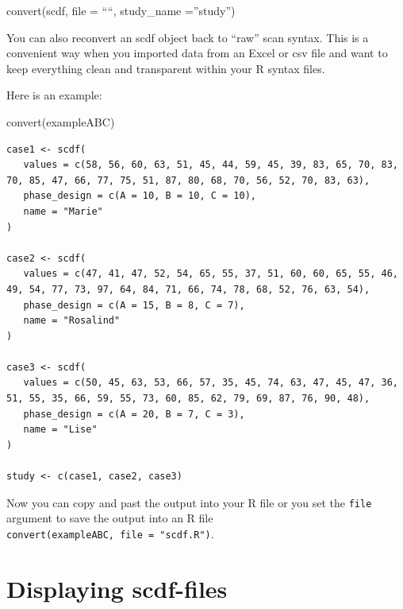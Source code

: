 \documentclass[
  letterpaper,
  DIV=11,
  numbers=noendperiod]{scrreprt}
\newenvironment{Shaded}{\begin{snugshade}}{\end{snugshade}}
\newcommand{\FunctionTok}[1]{\textcolor[rgb]{0.28,0.35,0.67}{#1}}
\newcommand{\NormalTok}[1]{\textcolor[rgb]{0.00,0.23,0.31}{#1}}
\begin{document}
\begin{tcolorbox}[enhanced jigsaw, toprule=.15mm, colframe=quarto-callout-tip-color-frame, left=2mm, colback=white, breakable, bottomrule=.15mm, arc=.35mm, rightrule=.15mm, leftrule=.75mm, opacityback=0]
\begin{minipage}[t]{5.5mm}
\textcolor{quarto-callout-tip-color}{\faLightbulb}
\end{minipage}%
\begin{minipage}[t]{\textwidth - 5.5mm}
convert(scdf, file = ````, study\_name =''study'')\end{minipage}%
\end{tcolorbox}

You can also reconvert an scdf object back to ``raw'' scan syntax. This
is a convenient way when you imported data from an Excel or csv file and
want to keep everything clean and transparent within your R syntax
files.

Here is an example:

\begin{Shaded}
\begin{Highlighting}[]
\FunctionTok{convert}\NormalTok{(exampleABC)}
\end{Highlighting}
\end{Shaded}

\begin{verbatim}
case1 <- scdf(
   values = c(58, 56, 60, 63, 51, 45, 44, 59, 45, 39, 83, 65, 70, 83, 70, 85, 47, 66, 77, 75, 51, 87, 80, 68, 70, 56, 52, 70, 83, 63), 
   phase_design = c(A = 10, B = 10, C = 10),
   name = "Marie"
)

case2 <- scdf(
   values = c(47, 41, 47, 52, 54, 65, 55, 37, 51, 60, 60, 65, 55, 46, 49, 54, 77, 73, 97, 64, 84, 71, 66, 74, 78, 68, 52, 76, 63, 54), 
   phase_design = c(A = 15, B = 8, C = 7),
   name = "Rosalind"
)

case3 <- scdf(
   values = c(50, 45, 63, 53, 66, 57, 35, 45, 74, 63, 47, 45, 47, 36, 51, 55, 35, 66, 59, 55, 73, 60, 85, 62, 79, 69, 87, 76, 90, 48), 
   phase_design = c(A = 20, B = 7, C = 3),
   name = "Lise"
)

study <- c(case1, case2, case3)
\end{verbatim}

Now you can copy and past the output into your R file or you set the
\texttt{file} argument to save the output into an R file
\texttt{convert(exampleABC,\ file\ =\ "scdf.R")}.

\hypertarget{displaying-scdf-files}{%
\section{Displaying scdf-files}\label{displaying-scdf-files}}
\end{document}
